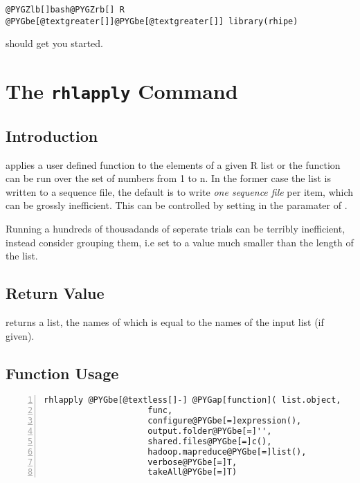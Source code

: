 \documentclass[letterpaper,10pt,english]{manual}
\begin{document}
\begin{Verbatim}[commandchars=@\[\]]
@PYGZlb[]bash@PYGZrb[] R
@PYGbe[@textgreater[]]@PYGbe[@textgreater[]] library(rhipe)
\end{Verbatim}

should get you started.

\resetcurrentobjects
\hypertarget{--doc-rhlapply}{}

\chapter{The \texttt{rhlapply} Command}


\section{Introduction}

 applies a user defined function to the elements of a given
R list or the function can be run over the set of numbers from 1 to
n. In the former case the list is written to a sequence file, the
default is to write \emph{one sequence file} per item, which can be grossly
inefficient. This can be controlled by setting  in
the  paramater of .

Running a hundreds of thousadands of seperate trials
can be terribly inefficient, instead consider grouping them, i.e set
 to a value much smaller than the length of the
list.


\section{Return Value}

 returns a list, the names of which is equal to the names
of the input list (if given).


\section{Function Usage}

\begin{Verbatim}[commandchars=@\[\],numbers=left,firstnumber=1,stepnumber=1]
rhlapply @PYGbe[@textless[]-] @PYGap[function]( list.object,
                     func,
                     configure@PYGbe[=]expression(),
                     output.folder@PYGbe[=]'',
                     shared.files@PYGbe[=]c(),
                     hadoop.mapreduce@PYGbe[=]list(),
                     verbose@PYGbe[=]T,
                     takeAll@PYGbe[=]T)
\end{Verbatim}
\end{document}

